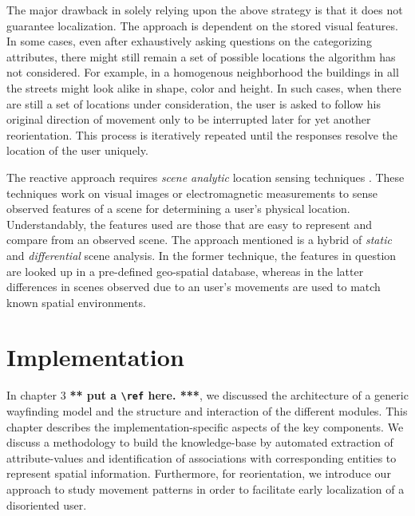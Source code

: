 \documentclass{iitkthesis}
\begin{document}
The major drawback in solely relying upon the above strategy is that it 
does not guarantee localization. The approach is dependent on the stored 
visual features. In some cases, even after exhaustively asking questions 
on the categorizing attributes, there might still remain a set of possible 
locations the algorithm has not considered. For example, in a 
homogenous neighborhood the buildings in all the streets might look alike in 
shape, color and height. In such cases, when there are still a set of 
locations under consideration, the user is asked to follow his original 
direction of movement only to be interrupted later for yet another 
reorientation. This process is iteratively repeated until the responses 
resolve the location of the user uniquely.

The reactive approach requires \textit{scene analytic} 
location sensing techniques \cite{hightower}. These techniques work on 
visual images or electromagnetic measurements to sense observed features 
of a scene for determining a user's physical location. Understandably, 
the features used are those that are easy to represent and compare from 
an observed scene. The approach mentioned is a hybrid of \textit{static} 
and \textit{differential} scene analysis. In the former technique, the
features in question are looked up in a pre-defined geo-spatial database, 
whereas in the latter differences in scenes observed due to an user's 
movements are used to match known spatial environments.

 \chapter{Implementation}
In chapter 3 {\bf *** put a \verb+\ref+ here. ***}, we discussed the 
architecture of a generic wayfinding model and the structure and interaction 
of the different modules. This chapter describes the implementation-specific 
aspects of the key components. We discuss a methodology to build the 
knowledge-base by automated extraction of attribute-values and 
identification of associations with corresponding entities to 
represent spatial information. Furthermore, for reorientation, 
we introduce our approach to study movement patterns in order to 
facilitate early localization of a disoriented user.
\end{document}
